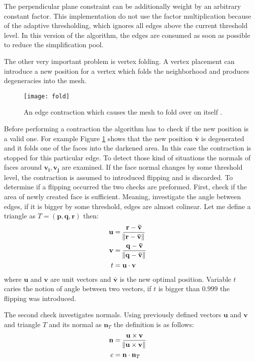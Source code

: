 The perpendicular plane constraint can be additionally weight by an arbitrary constant factor. This implementation do not use the factor multiplication because of the adaptive thresholding, which ignores all edges above the current threshold level. In this version of the algorithm, the edges are consumed as soon as possible to reduce the simplification pool.

The other very important problem is vertex folding. A vertex placement can introduce a new position for a vertex which folds the neighborhood and produces degeneracies into the mesh.

\begin{figure}[H]
  \begin{center}
    \texttt{[image: fold]}
    \caption{An edge contraction which causes the mesh to fold over on itself \cite{garland99}.}
    \label{fig:fold}
  \end{center}
\end{figure}

Before performing a contraction the algorithm has to check if the new position is a valid one. For example Figure \ref{fig:fold} shows that the new position $\mathbf{\bar{v}}$ is degenerated and it folds one of the faces into the darkened area. In this case the contraction is stopped for this particular edge. To detect those kind of situations the normals of faces around $\mathbf{v_i}, \mathbf{v_j}$ are examined. If the face normal changes by some threshold level, the contraction is assumed to introduced flipping and is discarded. To determine if a flipping occurred the two checks are preformed. First, check if the area of newly created face is sufficient. Meaning, investigate the angle between edges, if it is bigger by some threshold, edges are almost colinear. Let me define a triangle as $T = (\mathbf{p}, \mathbf{q}, \mathbf{r})$ then:
\begin{align}
\mathbf{u} &= \frac{\mathbf{r} - \mathbf{\bar{v}}}{\norm{\mathbf{r} - \mathbf{\bar{v}}}}\\
\mathbf{v} &= \frac{\mathbf{q} - \mathbf{\bar{v}}}{\norm{\mathbf{q} - \mathbf{\bar{v}}}}\\
t &= \mathbf{u} \cdot \mathbf{v}
\end{align}
where $\mathbf{u}$ and $\mathbf{v}$ are unit vectors and $\mathbf{\bar{v}}$ is the new optimal position. Variable $t$ caries the notion of angle between two vectors, if $t$ is bigger than $0.999$ the flipping was introduced.

The second check investigates normals. Using previously defined vectors $\mathbf{u}$ and $\mathbf{v}$ and triangle $T$ and its normal as $\mathbf{n}_T$ the definition is as follows:
\begin{align}
\mathbf{n} &= \frac{ \mathbf{u} \times \mathbf{v}}{\norm{\mathbf{u} \times \mathbf{v}}}\\
c &= \mathbf{n} \cdot \mathbf{n}_T
\end{align}

